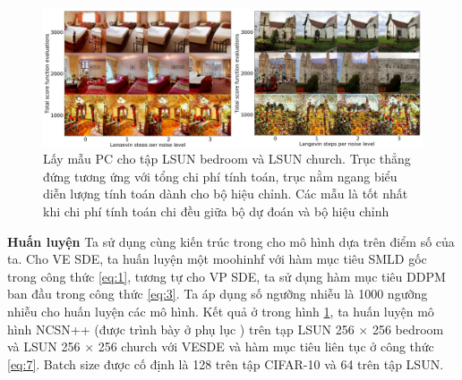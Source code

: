 \documentclass{article} %
\begin{document}
\begin{figure}[h!]
    \centering
    \includegraphics[width=0.8\linewidth]{figures/9.png}
    \caption{Lấy mẫu PC cho tập LSUN bedroom và LSUN church.
    Trục thẳng đứng tương ứng với tổng chi phí tính toán, trục nằm ngang biểu diễn lượng tính toán dành cho bộ hiệu chỉnh.
    Các mẫu là tốt nhất khi chi phí tính toán chi đều giữa bộ dự đoán và bộ hiệu chỉnh}
    \label{fig:9}
\end{figure}

\textbf{Huấn luyện} Ta sử dụng cùng kiến trúc trong \citep{ho2020denoising} cho mô hình dựa trên điểm số của ta.
Cho VE SDE, ta huấn luyện một moohinhf với hàm mục tiêu SMLD gốc trong công thức \ref{eq:1}, tương tự cho VP SDE,
ta sử dụng hàm mục tiêu DDPM ban đầu trong công thức \ref{eq:3}.
Ta áp dụng số ngưỡng nhiễu là 1000 ngưỡng nhiễu cho huấn luyện các mô hình.
Kết quả ở trong hình \ref{fig:9}, ta huấn luyện mô hình NCSN++ (được trình bày ở phụ lục ) trên tạp LSUN 256 $\times$ 256 bedroom và LSUN 256 $\times$ 256 church \citep{yu2015lsun} với VESDE và hàm mục tiêu liên tục ở công thức \ref{eq:7}.
Batch size được cố định là 128 trên tập CIFAR-10 và 64 trên tập LSUN.
\end{document}
